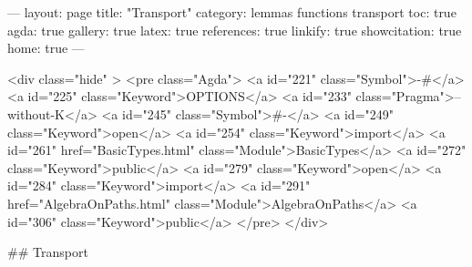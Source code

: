 
---
layout: page
title: "Transport"
category: lemmas functions transport
toc: true
agda: true
gallery: true
latex: true
references: true
linkify: true
showcitation: true
home: true
---

<div class="hide" >
<pre class="Agda">
<a id="221" class="Symbol">{-#</a> <a id="225" class="Keyword">OPTIONS</a> <a id="233" class="Pragma">--without-K</a> <a id="245" class="Symbol">#-}</a>
<a id="249" class="Keyword">open</a> <a id="254" class="Keyword">import</a> <a id="261" href="BasicTypes.html" class="Module">BasicTypes</a> <a id="272" class="Keyword">public</a>
<a id="279" class="Keyword">open</a> <a id="284" class="Keyword">import</a> <a id="291" href="AlgebraOnPaths.html" class="Module">AlgebraOnPaths</a> <a id="306" class="Keyword">public</a>
</pre>
</div>

## Transport


